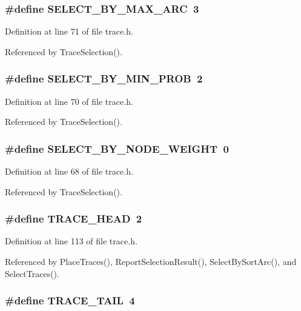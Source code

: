 \subsubsection{\setlength{\rightskip}{0pt plus 5cm}\#define SELECT\_\-BY\_\-MAX\_\-ARC~3}\label{trace_8h_4b1753a607a497d4d6b4467a1bb075e8}




Definition at line 71 of file trace.h.

Referenced by Trace\-Selection().
\subsubsection{\setlength{\rightskip}{0pt plus 5cm}\#define SELECT\_\-BY\_\-MIN\_\-PROB~2}\label{trace_8h_4335037d0e9917fc54e08d4ff99741b3}




Definition at line 70 of file trace.h.

Referenced by Trace\-Selection().
\subsubsection{\setlength{\rightskip}{0pt plus 5cm}\#define SELECT\_\-BY\_\-NODE\_\-WEIGHT~0}\label{trace_8h_da1c1193cabb6b05cedc48ab6899c8de}




Definition at line 68 of file trace.h.

Referenced by Trace\-Selection().
\subsubsection{\setlength{\rightskip}{0pt plus 5cm}\#define TRACE\_\-HEAD~2}\label{trace_8h_aa27fac2b7b540052a9f48e51b605c5f}




Definition at line 113 of file trace.h.

Referenced by Place\-Traces(), Report\-Selection\-Result(), Select\-By\-Sort\-Arc(), and Select\-Traces().
\subsubsection{\setlength{\rightskip}{0pt plus 5cm}\#define TRACE\_\-TAIL~4}\label{trace_8h_f54d5579fe9b0a5679de22214bc4d493}




